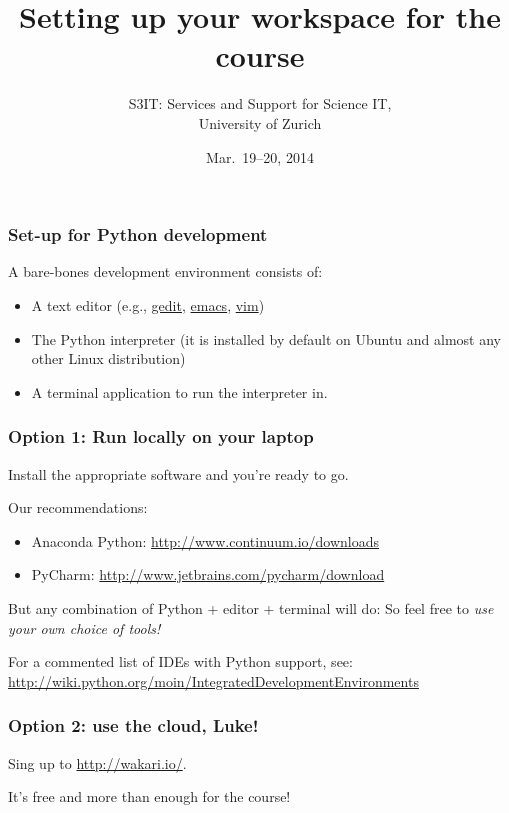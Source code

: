 \documentclass[english,serif,mathserif,xcolor=pdftex,dvipsnames,table]{beamer}
\title[Set-up]{%
  Setting up your workspace for the course
}
\author[S3IT]{%
  S3IT: Services and Support for Science IT, \\
  University of Zurich
}
\date{Mar.~19--20, 2014}
\begin{document}
\maketitle


\begin{frame}
  \frametitle{Set-up for Python development}
  A bare-bones development environment consists of:
  \begin{itemize}
  \item A text editor (e.g.,
    \href{http://en.wikipedia.org/wiki/Gedit}{gedit},
    \href{http://hide1713.wordpress.com/2009/01/30/setup-perfect-python-environment-in-emacs/}{emacs},
    \href{http://blog.dispatched.ch/2009/05/24/vim-as-python-ide/}{vim})
  \item The Python interpreter (it is installed by default on
    Ubuntu and almost any other Linux distribution)
  \item A terminal application to run the interpreter in.
  \end{itemize}
\end{frame}


\begin{frame}[fragile]
  \frametitle{Option 1: Run locally on your laptop}

  Install the appropriate software and you're ready to go.

  \+
  Our recommendations:
  \begin{itemize}
  \item Anaconda Python: {\footnotesize \url{http://www.continuum.io/downloads}}
  \item PyCharm: {\footnotesize \url{http://www.jetbrains.com/pycharm/download}}
  \end{itemize}

  \+
  But any combination of Python + editor + terminal will do: So
  feel free to \emph{use your own choice of tools!}

  \+ {\small For a commented list of {IDEs} with Python support, see:}
  {\footnotesize
    \url{http://wiki.python.org/moin/IntegratedDevelopmentEnvironments}}
\end{frame}


\begin{frame}
  \frametitle{Option 2: use the cloud, Luke!}

  Sing up to \url{http://wakari.io/}.

  \+
  It's free and more than enough for the course!
\end{frame}
\end{document}
